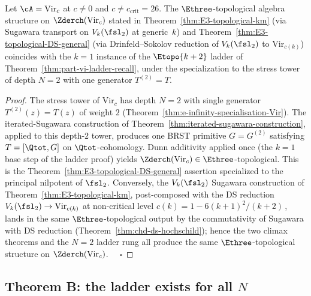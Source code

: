 \begin{theorem}[Part~VI climax is the $N=2$ rung of the iterated-Sugawara
 ladder; \ClaimStatusProvedHere]
\label{thm:part-vi-e3-climax-is-N2-rung}
Let $\cA = \mathrm{Vir}_c$ at $c \ne 0$ and $c \ne c_{\mathrm{crit}} = 26$.
The $\Ethree$-topological algebra structure on $\Zderch(\mathrm{Vir}_c)$
stated in Theorem~\ref{thm:E3-topological-km} \textup{(}via Sugawara
transport on $V_k(\fsl_2)$ at generic~$k$\textup{)} and
Theorem~\ref{thm:E3-topological-DS-general} \textup{(}via
Drinfeld--Sokolov reduction of $V_k(\fsl_2)$ to $\mathrm{Vir}_{c(k)}$\textup{)}
coincides with the $k=1$ instance of the $\Etopo{k+2}$ ladder of
Theorem~\ref{thm:part-vi-ladder-recall}, under the specialization to
the stress tower of depth $N=2$ with one generator $T^{(2)} = T$.
\end{theorem}
\begin{proof}
The stress tower of $\mathrm{Vir}_c$ has depth $N=2$ with single
generator $T^{(2)}(z) = T(z)$ of weight $2$
(Theorem~\ref{thm:e-infinity-specialisation-Vir}). The
iterated-Sugawara construction of
Theorem~\ref{thm:iterated-sugawara-construction}, applied to this
depth-$2$ tower, produces one BRST primitive $G = G^{(2)}$ satisfying
$T = [\Qtot, G]$ on $\Qtot$-cohomology. Dunn additivity applied once
(the $k=1$ base step of the ladder proof) yields $\Zderch(\mathrm{Vir}_c) \in
\Ethree$-topological. This is the
Theorem~\ref{thm:E3-topological-DS-general} assertion specialized to
the principal nilpotent of $\fsl_2$. Conversely, the $V_k(\fsl_2)$
Sugawara construction of Theorem~\ref{thm:E3-topological-km},
post-composed with the DS reduction
$V_k(\fsl_2) \to \mathrm{Vir}_{c(k)}$ at non-critical level
$c(k) = 1 - 6(k+1)^2/(k+2)$\,\cite{FeiginFrenkel}, lands in the same
$\Ethree$-topological output by the commutativity of Sugawara with DS
reduction (Theorem~\ref{thm:chd-ds-hochschild}); hence the two climax
theorems and the $N=2$ ladder rung all produce the same
$\Ethree$-topological structure on $\Zderch(\mathrm{Vir}_c)$. $\quad\square$
\end{proof}

\subsection{Theorem B: the ladder exists for all $N$}
\label{sec:part-vi-theorem-B}

